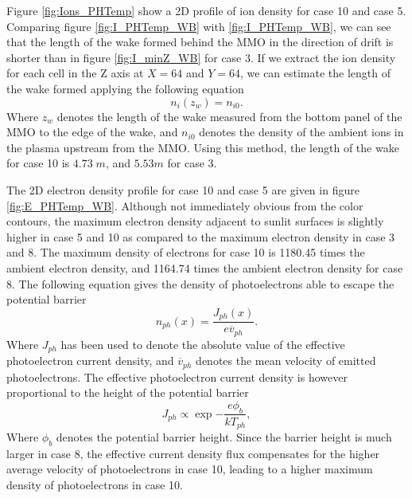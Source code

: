 Figure \ref{fig:Ions_PHTemp} show a 2D profile of ion density for case 10 and case 5. Comparing figure \ref{fig:I_PHTemp_WB} with \ref{fig:I_PHTemp_WB}, we can see that the length of the wake formed behind the MMO in the direction of drift is shorter than in figure \ref{fig:I_minZ_WB} for case 3. If we extract the ion density for each cell in the Z axis at $X = 64$ and $Y = 64$, we can estimate the length of the wake formed applying the following equation
\begin{equation}
    n_i(z_w) = n_{i0}.
\end{equation}
Where $z_w$ denotes the length of the wake measured from the bottom panel of the MMO to the edge of the wake, and $n_{i0}$ denotes the density of the ambient ions in the plasma upstream from the MMO. Using this method, the length of the wake for case 10 is $4.73 \; m$, and $5.53 m$ for case 3.

The 2D electron density profile for case 10 and case 5 are given in figure \ref{fig:E_PHTemp_WB}. Although not immediately obvious from the color contours, the maximum electron density adjacent to sunlit surfaces is slightly higher in case 5 and 10 as compared to the maximum electron density in case 3 and 8. The maximum density of electrons for case 10 is 1180.45 times the ambient electron density, and 1164.74 times the ambient electron density for case 8. The following equation gives the density of photoelectrons able to escape the potential barrier \parencite{Zhao1996}
\begin{equation}
    n_{ph}(x) = \frac{J_{ph}(x)}{e \overline{v}_{ph}}.
\end{equation}
Where $J_{ph}$ has been used to denote the absolute value of the effective photoelectron current density, and $\overline{v}_{ph}$ denotes the mean velocity of emitted photoelectrons. The effective photoelectron current density is however proportional to the height of the potential barrier
\begin{equation}
    J_{ph} \propto \exp{- \frac{e \phi_b}{k T_{ph}}},
\end{equation}
Where $\phi_b$ denotes the potential barrier height. Since the barrier height is much larger in case 8, the effective current density flux compensates for the higher average velocity of photoelectrons in case 10, leading to a higher maximum density of photoelectrons in case 10.